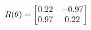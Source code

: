 \documentclass[preview]{standalone}
\begin{document}
\begin{align*}
\special{dvisvgm:raw <g id='unique000'>}R(\theta) = \begin{bmatrix}0.22 & -0.97\\0.97 & 0.22\end{bmatrix}\special{dvisvgm:raw </g>}
\end{align*}
\end{document}
